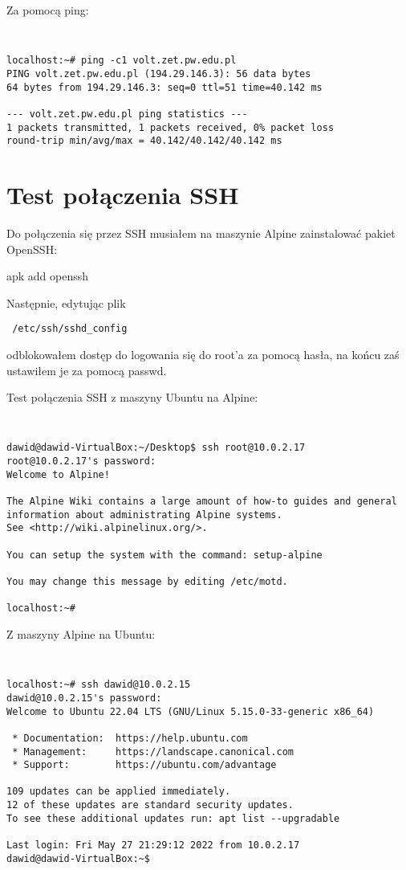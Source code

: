 \documentclass[a4paper,11pt]{article}
\begin{document}
Za pomocą ping:

{\tt
\begin{verbatim}
localhost:~# ping -c1 volt.zet.pw.edu.pl
PING volt.zet.pw.edu.pl (194.29.146.3): 56 data bytes
64 bytes from 194.29.146.3: seq=0 ttl=51 time=40.142 ms

--- volt.zet.pw.edu.pl ping statistics ---
1 packets transmitted, 1 packets received, 0% packet loss
round-trip min/avg/max = 40.142/40.142/40.142 ms
\end{verbatim}
}

\section{Test połączenia SSH}

Do połączenia się przez SSH musiałem na maszynie Alpine zainstalować pakiet OpenSSH: 

apk add openssh 

Następnie, edytując plik{\tt {\begin{verbatim} /etc/ssh/sshd_config \end{verbatim} } } odblokowałem dostęp do logowania się do root'a za pomocą hasła, na końcu zaś ustawiłem je za pomocą passwd.

Test połączenia SSH z maszyny Ubuntu na Alpine:

{\tt
\begin{verbatim}
dawid@dawid-VirtualBox:~/Desktop$ ssh root@10.0.2.17
root@10.0.2.17's password: 
Welcome to Alpine!

The Alpine Wiki contains a large amount of how-to guides and general
information about administrating Alpine systems.
See <http://wiki.alpinelinux.org/>.

You can setup the system with the command: setup-alpine

You may change this message by editing /etc/motd.

localhost:~#
\end{verbatim}
}

Z maszyny Alpine na Ubuntu:

{\tt
\begin{verbatim}
localhost:~# ssh dawid@10.0.2.15
dawid@10.0.2.15's password: 
Welcome to Ubuntu 22.04 LTS (GNU/Linux 5.15.0-33-generic x86_64)

 * Documentation:  https://help.ubuntu.com
 * Management:     https://landscape.canonical.com
 * Support:        https://ubuntu.com/advantage

109 updates can be applied immediately.
12 of these updates are standard security updates.
To see these additional updates run: apt list --upgradable

Last login: Fri May 27 21:29:12 2022 from 10.0.2.17
dawid@dawid-VirtualBox:~$ 
\end{verbatim}
}
\end{document}
